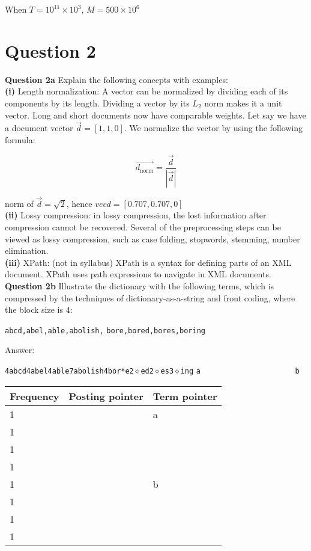 \documentclass[11pt,a4paper]{report}
\begin{document}
\begin{multicols*}{2}
\noindent When $T=10^{11} \times 10^3$, $M=500 \times 10^6$

\section{Question 2}

\noindent \textbf{Question 2a} Explain the following concepts with examples:\\

\noindent \textbf{(i)} Length normalization: A vector can be normalized by dividing each of its components by its length. Dividing a vector by its $L_2$ norm makes it a unit vector. Long and short documents now have comparable weights. Let say we have a document vector $\vec{d} = [1,1,0]$. We normalize the vector by using the following formula:

$$\vec{d_{\text{norm}}} = \frac{\vec{d}}{|\vec{d}|}$$

\noindent norm of $\vec{d} = \sqrt{2}$, hence $vec{d} = [0.707, 0.707, 0]$ \\

\noindent \textbf{(ii)} Lossy compression: in lossy compression, the lost information after compression cannot be recovered. Several of the preprocessing steps can be viewed as lossy compression, such as case folding, stopwords, stemming, number elimination. \\

\noindent \textbf{(iii)} XPath: (not in syllabus) XPath is a syntax for defining parts of an XML document. XPath uses path expressions to navigate in XML documents. \\

\noindent \textbf{Question 2b} Illustrate the dictionary with the following terms, which is compressed by the techniques of dictionary-as-a-string and front coding, where the block size is 4:
\begin{center}
\verb|abcd,abel,able,abolish,|
\verb|bore,bored,bores,boring|
\end{center}

\noindent Answer:

\noindent \verb|4abcd4abel4able7abolish4bor*e2|$\diamond$\verb|ed2|$\diamond$\verb|es3|$\diamond$\verb|ing|
\noindent \verb|a                      b|

\begin{center}
\begin{tabular}{ | l | l | l |} 
    \hline
    Frequency & Posting pointer & Term pointer \\
    \hline
    1 & & a \\
    1 & & \\
    1 & & \\
    1 & & \\
    1 & & b \\
    1 & & \\
    1 & & \\
    1 & & \\
    \hline
\end{tabular}
\end{center}


\end{multicols*}
\end{document}

